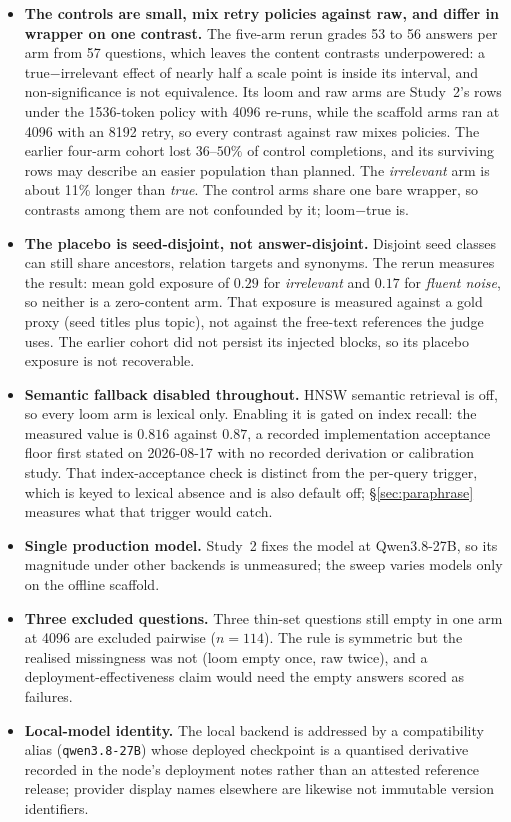 \documentclass[10pt,twocolumn]{article}
\begin{document}
\begin{itemize}[topsep=2pt,itemsep=2pt,leftmargin=1.4em]
\item \textbf{The controls are small, mix retry policies against raw, and differ in wrapper on one contrast.} The five-arm rerun grades 53 to 56 answers per arm from 57 questions, which leaves the content contrasts underpowered: a true$-$irrelevant effect of nearly half a scale point is inside its interval, and non-significance is not equivalence. Its loom and raw arms are Study~2's rows under the 1536-token policy with 4096 re-runs, while the scaffold arms ran at 4096 with an 8192 retry, so every contrast against raw mixes policies. The earlier four-arm cohort lost $36$--$50\%$ of control completions, and its surviving rows may describe an easier population than planned. The \emph{irrelevant} arm is about 11\% longer than \emph{true}. The control arms share one bare wrapper, so contrasts among them are not confounded by it; loom$-$true is.
\item \textbf{The placebo is seed-disjoint, not answer-disjoint.} Disjoint seed classes can still share ancestors, relation targets and synonyms. The rerun measures the result: mean gold exposure of $0.29$ for \emph{irrelevant} and $0.17$ for \emph{fluent noise}, so neither is a zero-content arm. That exposure is measured against a gold proxy (seed titles plus topic), not against the free-text references the judge uses. The earlier cohort did not persist its injected blocks, so its placebo exposure is not recoverable.
\item \textbf{Semantic fallback disabled throughout.} HNSW semantic retrieval is off, so every loom arm is lexical only. Enabling it is gated on index recall: the measured value is $0.816$ against $0.87$, a recorded implementation acceptance floor first stated on 2026-08-17 with no recorded derivation or calibration study. That index-acceptance check is distinct from the per-query trigger, which is keyed to lexical absence and is also default off; \S\ref{sec:paraphrase} measures what that trigger would catch.
\item \textbf{Single production model.} Study~2 fixes the model at Qwen3.8-27B, so its magnitude under other backends is unmeasured; the sweep varies models only on the offline scaffold.
\item \textbf{Three excluded questions.} Three thin-set questions still empty in one arm at 4096 are excluded pairwise ($n=114$). The rule is symmetric but the realised missingness was not (loom empty once, raw twice), and a deployment-effectiveness claim would need the empty answers scored as failures.
\item \textbf{Local-model identity.} The local backend is addressed by a compatibility alias (\texttt{qwen3.8-27B}) whose deployed checkpoint is a quantised derivative recorded in the node's deployment notes rather than an attested reference release; provider display names elsewhere are likewise not immutable version identifiers.

\end{itemize}
\end{document}
